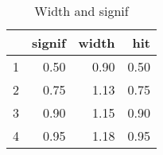\begin{table}[ht]
\centering
\begin{tabular}{rrrr}
  \toprule
 & signif & width & hit \\ 
  \midrule
1 & 0.50 & 0.90 & 0.50 \\ 
  2 & 0.75 & 1.13 & 0.75 \\ 
  3 & 0.90 & 1.15 & 0.90 \\ 
  4 & 0.95 & 1.18 & 0.95 \\ 
   \bottomrule
\end{tabular}
\caption{Width and signif} 
\end{table}
